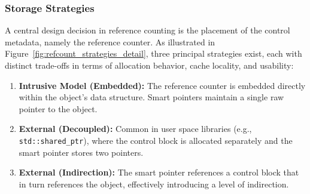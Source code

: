 \documentclass[a4paper,10pt,twoside]{report}
\theoremstyle{definition}
\begin{document}
\subsubsection{Storage Strategies}

A central design decision in reference counting is the placement of the control metadata, namely the reference counter. As illustrated in Figure~\ref{fig:refcount_strategies_detail}, three principal strategies exist, each with distinct trade-offs in terms of allocation behavior, cache locality, and usability:

\begin{enumerate}
    \item \textbf{Intrusive Model (Embedded):} The reference counter is embedded directly within the object's data structure. Smart pointers maintain a single raw pointer to the object.
    \item \textbf{External (Decoupled):} Common in user space libraries (e.g., \texttt{std::shared\_ptr}), where the control block is allocated separately and the smart pointer stores two pointers.
    \item \textbf{External (Indirection):} The smart pointer references a control block that in turn references the object, effectively introducing a level of indirection.
\end{enumerate}
\end{document}
